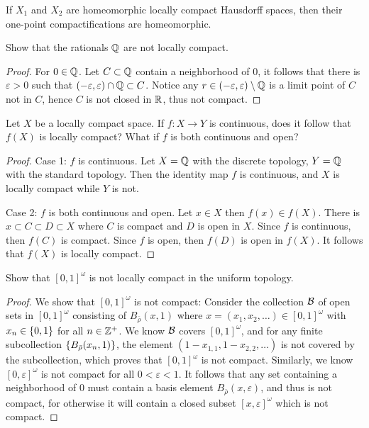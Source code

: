 \documentclass[12pt,a4paper]{article}
\begin{document}
    \begin{thm}
        If $X_1$ and $X_2$ are homeomorphic locally compact Hausdorff spaces, then their one-point compactifications are homeomorphic.
    \end{thm}
    \hfill

    \begin{ex}
        Show that the rationals $\mathbb{Q}$ are not locally compact.
    \end{ex}
    \begin{proof}
        For $0\in\mathbb{Q}$. Let $C\subset\mathbb{Q}$ contain a neighborhood of $0$, it follows that there is $\varepsilon>0$ such that $(-\varepsilon,\varepsilon)\cap\mathbb{Q} \subset C$. Notice any $r\in(-\varepsilon,\varepsilon)\setminus\mathbb{Q}$ is a limit point of $C$ not in $C$, hence $C$ is not closed in $\mathbb{R}$, thus not compact.
    \end{proof}
    \hfill

    \begin{ex}\label{3.7.10}
        Let $X$ be a locally compact space. If $f:X\to Y$ is continuous, does it follow that $f(X)$ is locally compact? What if $f$ is both continuous and open?
    \end{ex}
    \begin{proof}
        Case 1: $f$ is continuous. Let $X=\mathbb{Q}$ with the discrete topology, $Y=\mathbb{Q}$ with the standard topology. Then the identity map $f$ is continuous, and $X$ is locally compact while $Y$ is not. 
    
        Case 2: $f$ is both continuous and open. Let $x\in X$ then $f(x)\in f(X)$. There is $x\subset C\subset D\subset X$ where $C$ is compact and $D$ is open in $X$. Since $f$ is continuous, then $f(C)$ is compact. Since $f$ is open, then $f(D)$ is open in $f(X)$. It follows that $f(X)$ is locally compact.
    \end{proof}
    \hfill

    \begin{ex}
        Show that $[0,1]^\omega$ is not locally compact in the uniform topology.
    \end{ex}
    \begin{proof}
        We show that $[0,1]^\omega$ is not compact: Consider the collection $\mathcal{B}$ of open sets in $[0,1]^\omega$ consisting of $B_{\bar{\rho}}(x,1)$ where $x=(x_1,x_2,\dots)\in[0,1]^\omega$ with $x_n\in\left\{0,1\right\}$ for all $n\in\mathbb{Z}^+$. We know $\mathcal{B}$ covers $[0,1]^\omega$, and for any finite subcollection $\left\{B_{\bar{\rho}}(x_n,1)\right\}$, the element $(1-x_{1,1},1-x_{2,2},\dots)$ is not covered by the subcollection, which proves that $[0,1]^\omega$ is not compact. Similarly, we know $[0,\varepsilon]^\omega$ is not compact for all $0<\varepsilon<1$. It follows that any set containing a neighborhood of $0$ must contain a basis element $B_{\bar{\rho}}(x,\varepsilon)$, and thus is not compact, for otherwise it will contain a closed subset $[x,\varepsilon]^\omega$ which is not compact.
    \end{proof}
    \hfill
    
\end{document}
